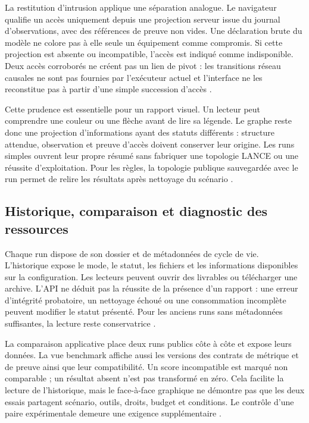 \documentclass[11pt,a4paper]{article}
\begin{document}
La restitution d'intrusion applique une séparation analogue. Le navigateur
qualifie un accès uniquement depuis une projection serveur issue du journal
d'observations, avec des références de preuve non vides. Une déclaration brute
du modèle ne colore pas à elle seule un équipement comme compromis. Si cette
projection est absente ou incompatible, l'accès est indiqué comme indisponible.
Deux accès corroborés ne créent pas un lien de pivot : les transitions réseau
causales ne sont pas fournies par l'exécuteur actuel et l'interface ne les
reconstitue pas à partir d'une simple succession d'accès
\cite{app-ui,app-intrusion-tests}.

Cette prudence est essentielle pour un rapport visuel. Un lecteur peut comprendre
une couleur ou une flèche avant de lire sa légende. Le graphe reste donc une
projection d'informations ayant des statuts différents : structure attendue,
observation et preuve d'accès doivent conserver leur origine. Les runs simples
ouvrent leur propre résumé sans fabriquer une topologie LANCE ou une réussite
d'exploitation. Pour les règles, la topologie publique sauvegardée avec le run
permet de relire les résultats après nettoyage du scénario
\cite{app-modes,app-ui}.

\subsection{Historique, comparaison et diagnostic des ressources}
Chaque run dispose de son dossier et de métadonnées de cycle de vie. L'historique
expose le mode, le statut, les fichiers et les informations disponibles sur la
configuration. Les lecteurs peuvent ouvrir des livrables ou télécharger une
archive. L'API ne déduit pas la réussite de la présence d'un rapport : une erreur
d'intégrité probatoire, un nettoyage échoué ou une consommation incomplète
peuvent modifier le statut présenté. Pour les anciens runs sans métadonnées
suffisantes, la lecture reste conservatrice \cite{app-runs,app-artifacts}.

La comparaison applicative place deux runs publics côte à côte et expose leurs
données. La vue benchmark affiche aussi les versions des contrats de métrique
et de preuve ainsi que leur compatibilité. Un score incompatible est marqué
non comparable ; un résultat absent n'est pas transformé en zéro. Cela facilite
la lecture de l'historique, mais le face-à-face graphique ne démontre pas que
les deux essais partagent scénario, outils, droits, budget et conditions. Le
contrôle d'une paire expérimentale demeure une exigence supplémentaire
\cite{app-ui,app-summary-tests}.
\end{document}
